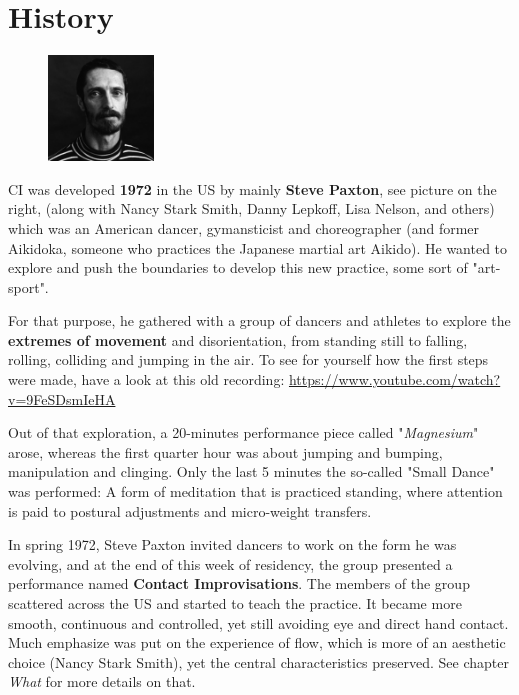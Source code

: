 \section{History}

\begin{figure}
\centering
\includegraphics[width=0.25\textwidth]{images/history.jpg}
\end{figure}

CI was developed \textbf{1972} in the US by mainly \textbf{Steve Paxton}, see picture on the right, (along with Nancy Stark Smith, Danny Lepkoff, Lisa Nelson, and others) which was an American dancer, gymansticist and choreographer (and former Aikidoka, someone who practices the Japanese martial art Aikido). He wanted to explore and push the boundaries to develop this new practice, some sort of "art-sport".

For that purpose, he gathered with a group of dancers and athletes to explore the \textbf{extremes of movement} and disorientation, from standing still to falling, rolling, colliding and jumping in the air. To see for yourself how the first steps were made, have a look at this old recording: \url{https://www.youtube.com/watch?v=9FeSDsmIeHA}

Out of that exploration, a 20-minutes performance piece called "\textit{Magnesium}" arose, whereas the first quarter hour was about jumping and bumping, manipulation and clinging. Only the last 5 minutes the so-called "Small Dance" was performed: A form of meditation that is practiced standing, where attention is paid to postural adjustments and micro-weight transfers.

In spring 1972, Steve Paxton invited dancers to work on the form he was evolving, and at the end of this week of residency, the group presented a performance named \textbf{Contact Improvisations}. The members of the group scattered across the US and started to teach the practice. It became more smooth, continuous and controlled, yet still avoiding eye and direct hand contact. Much emphasize was put on the experience of flow, which is more of an aesthetic choice (Nancy Stark Smith), yet the central characteristics preserved. See chapter \textit{What} for more details on that.

